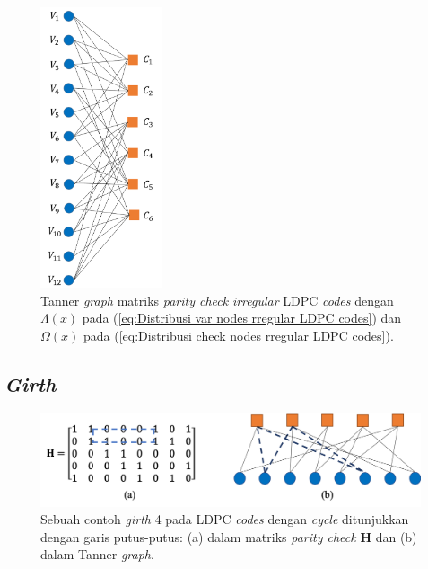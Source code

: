 \begin{figure}
	\centering
	\includegraphics[width=0.32\textwidth]
		{pics/diagram/ldpc3.png}
		\caption{Tanner\textit{ graph} matriks \textit{parity check} \textit{irregular} LDPC \textit{codes} dengan $\Lambda(x)$ pada (\ref{eq:Distribusi var nodes rregular LDPC codes}) dan $\Omega(x)$ pada (\ref{eq:Distribusi check nodes rregular LDPC codes}).}
	\label{fig:tg Irregular LDPC codes}
\end{figure} 

\subsection{\textit{Girth}}
\begin{figure}[b]
	\centering 
	\includegraphics[scale=0.6]{pics/GirthH2}
	\centering 
	\caption{Sebuah contoh \textit{girth} 4 pada LDPC \textit{codes} dengan \textit{cycle} ditunjukkan dengan garis putus-putus: (a) dalam matriks \textit{parity check} $\mathbf{H}$ dan (b) dalam Tanner \textit{graph}.}
	\label{fig:girth}
\end{figure}

